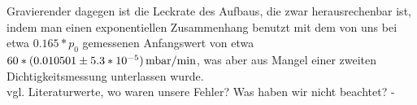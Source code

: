 \documentclass[]{article}
\begin{document}
	Gravierender dagegen ist die Leckrate des Aufbaus, die zwar herausrechenbar ist, indem man einen exponentiellen Zusammenhang benutzt mit dem von uns bei etwa $0.165*p_0$ gemessenen Anfangswert von etwa $60*(0.010501 \pm 5.3*10^{-5})\SI{}{ \, \milli \bar /{\minute}}$, was aber aus Mangel einer zweiten Dichtigkeitsmessung unterlassen wurde. \\
	{\color{red}vgl. Literaturwerte, wo waren unsere Fehler? Was haben wir nicht beachtet? - }
\end{document}
